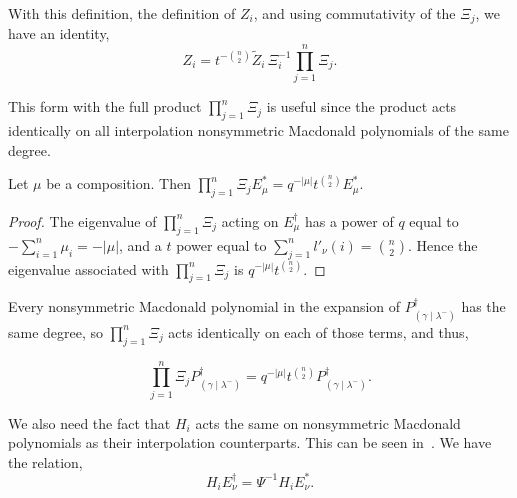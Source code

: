 \documentclass[ALCO]{cedram}
\newcommand{\ZZ}{\widetilde{Z}}
\newcommand{\EB}[1]{E_{#1}^\dagger}
\newcommand{\Estar}[1]{E^*_{#1}}
\newcommand{\PB}[1]{P_{#1}^\dagger}
\newcommand{\gammalambdamin}{{(\gamma \mid \lambda^-)}}
\begin{document}
With this definition, the definition of $Z_i$, and using commutativity of the $\Xi_j$, we have an identity,
\[ Z_i = t^{-\binom{n}{2}} \ZZ_i\, \Xi_i^{-1} \prod_{j=1}^n \Xi_j. \]

This form with the full product $\displaystyle{\prod_{j=1}^n \Xi_j}$ is useful since the product acts identically on all interpolation nonsymmetric Macdonald polynomials of the same degree.

\begin{lemm}
Let $\mu$ be a composition. Then $\displaystyle{\prod_{j=1}^n \Xi_j \Estar{\mu} = q^{-|\mu|} t^{\binom{n}{2}} \Estar{\mu}}$.
\end{lemm} \begin{proof} The eigenvalue of $\displaystyle{\prod_{j=1}^n \Xi_j}$ acting on $E^\dagger_{\mu}$ has a power of $q$ equal to $\displaystyle{-\sum_{i=1}^n \mu_i} = -|\mu|$, and a $t$ power equal to $\displaystyle{\sum_{j=1}^n l'_\nu(i) = \binom{n}{2}}$. Hence the eigenvalue associated with $\displaystyle{\prod_{j=1}^n \Xi_j}$ is $q^{-|\mu|} t^{\binom{n}{2}}$.
\qedhere
\end{proof}


Every nonsymmetric Macdonald polynomial in the expansion of $\PB{\gammalambdamin}$ has the same degree, so $\displaystyle{\prod_{j=1}^n \Xi_j}$ acts identically on each of those terms, and thus,


\[ \prod_{j=1}^n \Xi_j \PB{\gammalambdamin} = q^{-|\mu|}t^{\binom{n}{2}} \PB{\gammalambdamin}.\]

We also need the fact that $H_i$ acts the same on nonsymmetric Macdonald polynomials as their interpolation counterparts. This can be seen in~\cite[page 6]{MR2534801}. We have the relation,
\begin{equation}\label{Tiactthesame} H_i \EB{\nu} = \Psi^{-1} H_i \Estar{\nu} .\end{equation}
\end{document}

